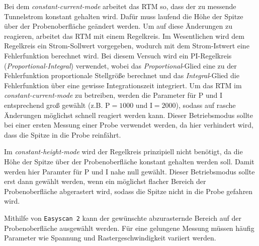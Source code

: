 Bei dem \textit{constant-current-mode} arbeitet das RTM so, dass der zu messende Tunnelstrom konstant gehalten wird. Dafür muss laufend die Höhe der Spitze
über der Probenoberfläche geändert werden. Um auf diese Änderungen zu reagieren, arbeitet das RTM mit einem Regelkreis. Im Wesentlichen wird dem Regelkreis
ein Strom-Sollwert vorgegeben, wodurch mit dem Strom-Istwert eine Fehlerfunktion berechnet wird. Bei diesem Versuch wird ein PI-Regelkreis (\textit{Proportional-Integral}) verwendet,
wobei das \textit{Proportional}-Glied eine zu der Fehlerfunktion proportionale Stellgröße berechnet und das \textit{Integral}-Glied die Fehlerfunktion über eine gewisse
Integrationszeit integriert. Um das RTM im \textit{constant-current-mode} zu betreiben, werden die Parameter für P und I entsprechend groß gewählt (z.B. $\mathrm{P} = 1000$ und $\mathrm{I} = 2000$),
sodass auf rasche Änderungen möglichst schnell reagiert werden kann. Dieser Betriebsmodus sollte bei einer ersten Messung einer Probe verwendet werden, da hier verhindert wird,
dass die Spitze in die Probe reinfährt.\par
Im \textit{constant-height-mode} wird der Regelkreis prinzipiell nicht benötigt, da die Höhe der Spitze über der Probenoberfläche konstant gehalten werden soll.
Damit werden hier Paramter für P und I nahe null gewählt. Dieser Betriebsmodus sollte erst dann gewählt werden, wenn ein möglichst flacher Bereich der Probenoberfläche abgerastert wird,
sodass die Spitze nicht in die Probe gefahren wird.\par
Mithilfe von \texttt{Easyscan 2} kann der gewünschte abzurasternde Bereich auf der Probenoberfläche ausgewählt werden. Für eine gelungene Messung müssen häufig Parameter wie Spannung
und Rastergeschwindigkeit variiert werden.